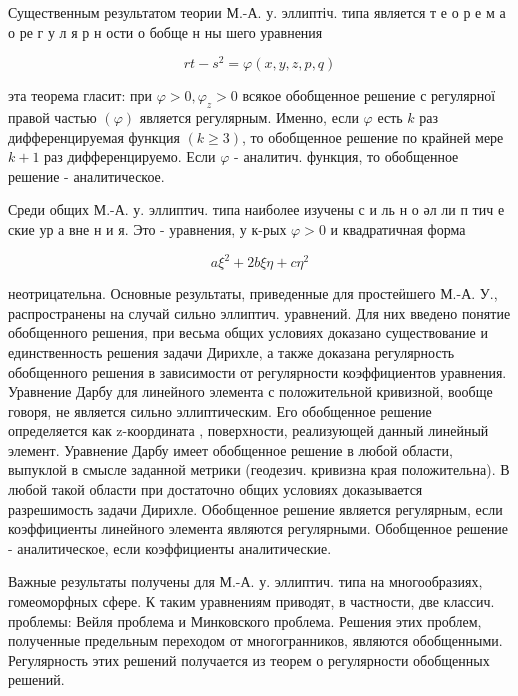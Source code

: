 \documentclass[10pt]{article}
\begin{document}
Существенным результатом теории М.-А. у. эллиптіч. типа является т е о р е м а о ре г у л я р н ости о бобще н ны шего уравнения



\[

r t-s^{2}=\varphi(x, y, z, p, q)

\]



эта теорема гласит: при $\varphi>0, \varphi_{z}>0$ всякое обобщенное решение с регулярної правой частью $(\varphi)$ является регулярным. Именно, если $\varphi$ есть $k$ раз дифференцируемая функция $(k \geqslant 3)$, то обобщенное решение по крайней мере $k+1$ раз дифференцируемо. Если $\varphi$ - аналитич. функция, то обобщенное решение - аналитическое.



Среди общих М.-А. у. эллиптич. типа наиболее изучены с и ль н о әл ли п тич е ские ур а вне н и я. Это - уравнения, у к-рых $\varphi>0$ и квадратичная форма



\[

a \xi^{2}+2 b \xi \eta+c \eta^{2}

\]



неотрицательна. Основные результаты, приведенные для простеӥшего М.-А. У., распространены на случай сильно эллиптич. уравнений. Для них введено понятие обобщенного решения, при весьма общих условиях доказано существование и единственность решения задачи Дирихле, а также доказана регулярность обобщенного решения в зависимости от регулярности коэффициентов уравнения. Уравнение Дарбу для линейного элемента с положительной кривизной, вообще говоря, не является сильно эллиптическим. Его обобщенное решение определяется как z-координата , поверхности, реализующей данный линейный элемент. Уравнение Дарбу имеет обобщенное решение в любой области, выпуклой в смысле заданной метрики (геодезич. кривизна края положительна). В любой такой области при достаточно общих условиях доказывается разрешимость задачи Дирихле. Обобщенное решение является регулярным, если коэффициенты линейного элемента являются регулярными. Обобщенное решение - аналитическое, если коэффициенты аналитические.



Важные результаты получены для М.-А. у. эллиптич. типа на многообразиях, гомеоморфных сфере. К таким уравнениям приводят, в частности, две классич. проблемы: Вейля проблема и Минковского проблема. Решения этих проблем, полученные предельным переходом от многогранников, являются обобщенными. Регулярность этих решений получается из теорем о регулярности обобщенных решений.
\end{document}
